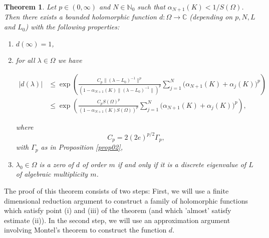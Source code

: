 \documentclass[12pt,a4paper]{article}
\newtheorem{theorem}{Theorem}[section]
\theoremstyle{definition}
\theoremstyle{remark}
\numberwithin{equation}{section}
\begin{document}
\begin{theorem} \label{prop1} Let $p \in (0,\infty)$ and $N\in\mathbb{N}_0$ such that $\alpha_{N+1}(K)<{1}/{S(\Omega)}$. Then there exists a bounded holomorphic function $d:\Omega\rightarrow \mathbb{C}$ (depending on $p,N,L$ and $L_0$) with the following properties: 
  \begin{enumerate} 
      \item[(i)] $d(\infty)=1$,
      \item[(ii)] for all $\lambda \in \Omega$ we have 
    \begin{small}
      \begin{align*}
|d(\lambda)|&\leq  \exp\left( \frac{C_p \|(\lambda - L_0)^{-1}\|^p }{\left(1-\alpha_{N+1}(K)\|(\lambda-L_0)^{-1}\|\right)^p}\sum_{j=1}^N\Big( \alpha_{N+1}(K) + \alpha_j(K) \Big)^p\right)\\
&\leq \exp\left( \frac{C_pS(\Omega)^p }{(1-\alpha_{N+1}(K)S(\Omega))^p}\sum_{j=1}^N\Big( \alpha_{N+1}(K) + \alpha_j(K) \Big)^p \right),
\end{align*}
\end{small}
where
\begin{equation}
  \label{eq:9}
C_p= 2(2e)^{p/2} \Gamma_p,  
\end{equation}
with $\Gamma_p$ as in Proposition \ref{prop02},
      \item[(iii)] $\lambda_0 \in \Omega$ is a zero of $d$ of order $m$ if and only if it is a discrete eigenvalue of $L$ of algebraic multiplicity $m$.
  \end{enumerate}
\end{theorem} 
The proof of this theorem consists of two steps: First, we will use a finite dimensional reduction argument to construct a family of holomorphic functions  which satisfy point (i) and (iii) of the theorem (and which 'almost' satisfy estimate (ii)). In the second step, we will use an approximation argument involving Montel's theorem to construct the function $d$.  
\end{document}
